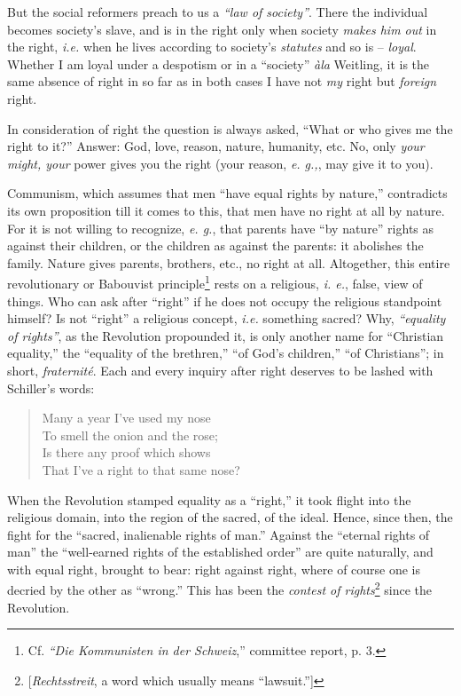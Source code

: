 \documentclass[12pt,a4paper]{book}
\begin{document}
But the social reformers preach to us a \textit{``law of society''}. There 
the individual becomes society's slave, and is in the right only when society 
\textit{makes him out} in the right, \textit{i.e.} when he lives according to 
society's \textit{statutes} and so is -- \textit{loyal}. Whether I am loyal 
under a despotism or in a ``society'' \textit{\`ala} Weitling, it is the 
same absence of right in so far as in both cases I have not \textit{my} right 
but \textit{foreign} right.

In consideration of right the question is always asked, ``What or who gives 
me the right to it?'' Answer: God, love, reason, nature, humanity, etc. No, 
only \textit{your might, your} power gives you the right (your reason, 
\textit{e. g.,}, may give it to you).

Communism, which assumes that men ``have equal rights by nature,'' 
contradicts its own proposition till it comes to this, that men have no right 
at all by nature. For it is not willing to recognize, \textit{e. g.}, that 
parents have ``by nature'' rights as against their children, or the children 
as against the parents: it abolishes the family. Nature gives parents, 
brothers, etc., no right at all. Altogether, this entire revolutionary or 
Babouvist principle\footnote{Cf. \textit{``Die Kommunisten in der 
Schweiz},'' committee report, p. 3.} rests on a religious, \textit{i. e.}, 
false, view of things. Who can ask after ``right'' if he does not occupy the 
religious standpoint himself? Is not ``right'' a religious concept, 
\textit{i.e.} something sacred? Why, \textit{``equality of rights''}, as the 
Revolution propounded it, is only another name for ``Christian equality,'' 
the ``equality of the brethren,'' ``of God's children,'' ``of 
Christians''; in short, \textit{fraternit\'e}. Each and every inquiry after 
right deserves to be lashed with Schiller's words:

\begin{quotation}

\noindent{} Many a year I've used my nose\\
 To smell the onion and the rose;\\
 Is there any proof which shows\\
 That I've a right to that same nose? \end{quotation}

\noindent{}When the Revolution stamped equality as a ``right,'' it took 
flight into the religious domain, into the region of the sacred, of the ideal. 
Hence, since then, the fight for the ``sacred, inalienable rights of man.'' 
Against the ``eternal rights of man'' the ``well-earned rights of the 
established order'' are quite naturally, and with equal right, brought to 
bear: right against right, where of course one is decried by the other as 
``wrong.'' This has been the \textit{contest of 
rights}\footnote{[\textit{Rechtsstreit}, a word which usually means 
``lawsuit.'']} since the Revolution.
\end{document}
